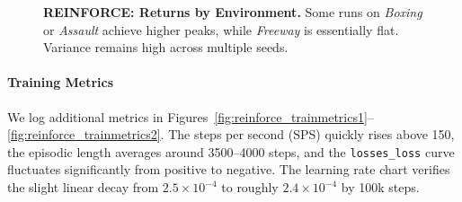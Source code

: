 \begin{figure}[htbp]
	\centering
	\quad
	\caption{\textbf{REINFORCE: Returns by Environment.} 
		Some runs on \emph{Boxing} or \emph{Assault} achieve higher peaks, 
		while \emph{Freeway} is essentially flat. 
		Variance remains high across multiple seeds.}
	\label{fig:reinforce_pergame_return}
\end{figure}

\paragraph{Training Metrics}
We log additional metrics in Figures~\ref{fig:reinforce_trainmetrics1}--\ref{fig:reinforce_trainmetrics2}. 
The steps per second (SPS) quickly rises above 150, the episodic length averages around 3500–4000 steps,
and the \texttt{losses\_loss} curve fluctuates significantly from positive to negative. 
The learning rate chart verifies the slight linear decay from $2.5\times10^{-4}$ to roughly $2.4\times10^{-4}$ by 100k steps.


